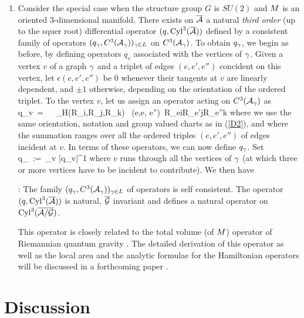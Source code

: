 \begin{enumerate}
\item
Consider the special case when the structure group $G$ is $SU(2)$ and
$\S$ is an oriented 3-dimensional manifold. There exists on $\ab$ a
natural  {\it third order} (up to the squer root)
differential  operator $({q}, \Cyl^3(\Ab))$ 
defined by a consistent family of operators $(q_\g, C^3(\A_\g))_{\g\in
L}$ on $C^3(\A_\g)$. To obtain $q_\g$, we begin as before, by defining
operators $q_v$ associated with the vertices of $\g$. Given a vertex
$v$ of a graph $\g$ and a triplet of edges $(e,e',e'')$ concident on
this vertex, let $\epsilon(e,e',e'')$ be $0$ whenever their tangents
at $v$ are linearly dependent, and $\pm 1$ otherwise, depending on the
orientation of the ordered triplet. To the vertex $v$, let us assign
an operator acting on $C^3(\A_\g)$ as
\be
q_v\ =\ \ \ \mu_H(R_i,R_j,R_k) 
 \  \epsilon(e,e, e'')\  
R_{ei}R_{e'j}R_{e''k}
\ee
where we use the same orientation, notation and group valued charts as
in (\ref{D2}), and where the summation ranges over all the ordered
triples $(e,e',e'')$ of edges incident at $v$. In terms of these
operators, we can now define $q_\g$. Set
\be
q_\g\ :=\ \sum_v |q_v|^{1}
\ee
where $v$ runs through all the vertices of $\g$ (at which three or
more vertices have to be incident to contribute). We then have
\begin{proposition}{\rm :} The family $(q_\g, C^3(\A_\g))_{\g\in L}$ of
operators is self consistent. The operator $({q}, \Cyl^3(\ab))$ is
natural, $\Gb$ invariant and defines a natural operator on
$\Cyl^3(\agb)$.
\end{proposition}
\noindent This operator is closely related to the total volume 
(of $\S$) operator of Riemannian quantum gravity \cite{RS,ALMMT2}.
The detailed derivation of this operator as well as the local area
and the analytic formulae for the Hamiltonian
operators will be discussed in a forthcoming paper \cite{AL4}.
\end{enumerate}


\section{Discussion}

